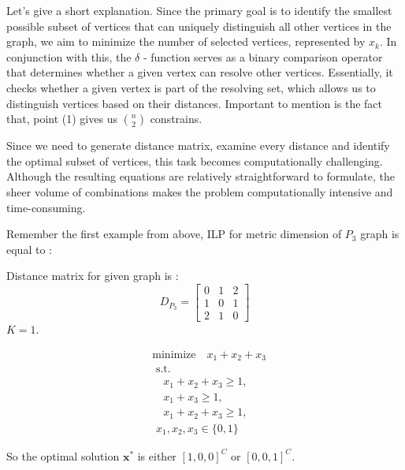 \documentclass[12pt]{amsart}
\theoremstyle{plain}
\begin{document}
Let's give a short explanation. Since the primary goal is to identify the smallest possible subset of vertices that can uniquely distinguish all other vertices in the graph, we aim to minimize the number of selected vertices, represented by $ x_k $. In conjunction with this, the $ \delta $ - function serves as a binary comparison operator that determines whether a given vertex can resolve other vertices. Essentially, it checks whether a given vertex is part of the resolving set, which allows us to distinguish vertices based on their distances. Important to mention is the fact that, point (1) gives us $ \binom{n}{2} $ constrains.

Since we need to generate distance matrix, examine every distance and identify the optimal subset of vertices, this task becomes computationally challenging. Although the resulting equations are relatively straightforward to formulate, the sheer volume of combinations makes the problem computationally intensive and time-consuming.

\newpage

Remember the first example from above, ILP for metric dimension of $ P_3 $ graph is equal to :

\begin{minipage}[t]{0.4\textwidth}
  Distance matrix for given graph is :
  \vspace{0.2cm}
  $$
  D_{P_3} =
  \begin{bmatrix*}
    0 & 1 & 2 \\
    1 & 0 & 1 \\
    2 & 1 & 0
  \end{bmatrix*}
  $$
  \vspace{0.4cm}
  $K = 1$.
\end{minipage}%
\begin{minipage}[t]{0.55\textwidth}
  \vspace{-0.3cm}
  $$
  \begin{aligned}
    & \text{minimize} \quad x_1 + x_2 + x_3 \\
    & \,\, \text{s.t.} \\
    & \quad x_1 + x_2 + x_3 \geq 1, \\
    & \quad x_1 + x_3 \geq 1, \\
    & \quad x_1 + x_2 + x_3 \geq 1, \\
    & \,\, x_1, x_2, x_3 \in \{0, 1\}
  \end{aligned}
  $$
\end{minipage}

So the optimal solution $\mathbf{x}^{*}$ is either $[1,0,0]^{C} $ or $ [0,0,1]^{C} $.
\end{document}
